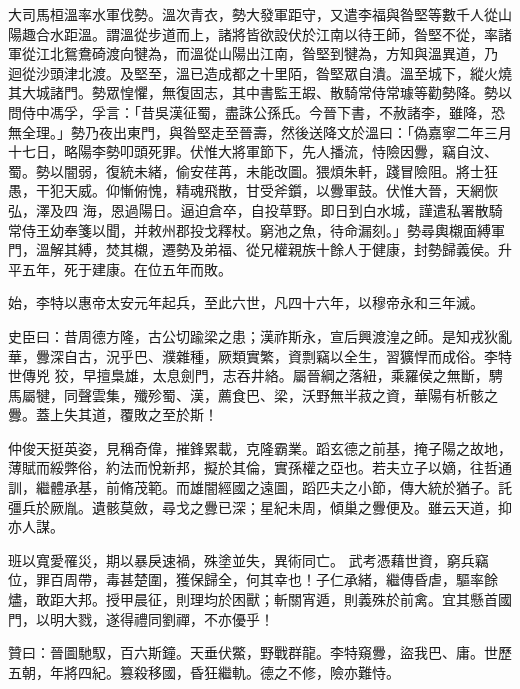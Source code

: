 \begin{pinyinscope}
 大司馬桓溫率水軍伐勢。溫次青衣，勢大發軍距守，又遣李福與昝堅等數千人從山陽趣合水距溫。謂溫從步道而上，諸將皆欲設伏於江南以待王師，昝堅不從，率諸軍從江北鴛鴦碕渡向犍為，而溫從山陽出江南，昝堅到犍為，方知與溫異道，乃
 迴從沙頭津北渡。及堅至，溫已造成都之十里陌，昝堅眾自潰。溫至城下，縱火燒其大城諸門。勢眾惶懼，無復固志，其中書監王嘏、散騎常侍常璩等勸勢降。勢以問侍中馮孚，孚言：「昔吳漢征蜀，盡誅公孫氏。今晉下書，不赦諸李，雖降，恐無全理。」勢乃夜出東門，與昝堅走至晉壽，然後送降文於溫曰：「偽嘉寧二年三月十七日，略陽李勢叩頭死罪。伏惟大將軍節下，先人播流，恃險因釁，竊自汶、蜀。勢以闇弱，復統未緒，偷安荏苒，未能改圖。猥煩朱軒，踐冒險阻。將士狂愚，干犯天威。仰慚俯愧，精魂飛散，甘受斧鑕，以釁軍鼓。伏惟大晉，天網恢弘，澤及四
 海，恩過陽日。逼迫倉卒，自投草野。即日到白水城，謹遣私署散騎常侍王幼奉箋以聞，并敕州郡投戈釋杖。窮池之魚，待命漏刻。」勢尋輿櫬面縛軍門，溫解其縛，焚其櫬，遷勢及弟福、從兄權親族十餘人于健康，封勢歸義侯。升平五年，死于建康。在位五年而敗。



 始，李特以惠帝太安元年起兵，至此六世，凡四十六年，以穆帝永和三年滅。



 史臣曰：昔周德方隆，古公切踰梁之患；漢祚斯永，宣后興渡湟之師。是知戎狄亂華，釁深自古，況乎巴、濮雜種，厥類實繁，資剽竊以全生，習獷悍而成俗。李特世傳兇
 狡，早擅梟雄，太息劍門，志吞井絡。屬晉綱之落紐，乘羅侯之無斷，騁馬屬犍，同聲雲集，殲殄蜀、漢，薦食巴、梁，沃野無半菽之資，華陽有析骸之釁。蓋上失其道，覆敗之至於斯！



 仲俊天挺英姿，見稱奇偉，摧鋒累載，克隆霸業。蹈玄德之前基，掩子陽之故地，薄賦而綏弊俗，約法而悅新邦，擬於其倫，實孫權之亞也。若夫立子以嫡，往哲通訓，繼體承基，前脩茂範。而雄闇經國之遠圖，蹈匹夫之小節，傳大統於猶子。託彊兵於厥胤。遺骸莫斂，尋戈之釁已深；星紀未周，傾巢之釁便及。雖云天道，抑亦人謀。



 班以寬愛罹災，期以暴戾速禍，殊塗並失，異術同亡。
 武考憑藉世資，窮兵竊位，罪百周帶，毒甚楚圍，獲保歸全，何其幸也！子仁承緒，繼傳昏虐，驅率餘燼，敢距大邦。授甲晨征，則理均於困獸；斬關宵遁，則義殊於前禽。宜其懸首國門，以明大戮，遂得禮同劉禪，不亦優乎！



 贊曰：晉圖馳馭，百六斯鐘。天垂伏鱉，野戰群龍。李特窺釁，盜我巴、庸。世歷五朝，年將四紀。篡殺移國，昏狂繼軌。德之不修，險亦難恃。



\end{pinyinscope}